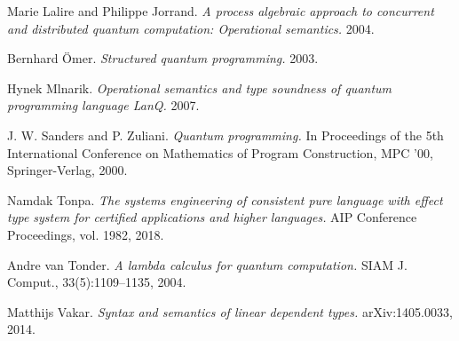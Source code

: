 \documentclass{article}
\theoremstyle{definition}
\begin{document}
\begin{thebibliography}{99}
Marie Lalire and Philippe Jorrand.
\textit{A process algebraic approach to concurrent and distributed quantum computation: Operational semantics.}
2004.

Bernhard Ömer.
\textit{Structured quantum programming.}
2003.

Hynek Mlnarik.
\textit{Operational semantics and type soundness of quantum programming language LanQ.}
2007.

J. W. Sanders and P. Zuliani.
\textit{Quantum programming.}
In Proceedings of the 5th International Conference on Mathematics of Program Construction, MPC '00, Springer-Verlag, 2000.

Namdak Tonpa.
\textit{The systems engineering of consistent pure language with effect type system for certified applications and higher languages.}
AIP Conference Proceedings, vol. 1982, 2018.

Andre van Tonder.
\textit{A lambda calculus for quantum computation.}
SIAM J. Comput., 33(5):1109–1135, 2004.

Matthijs Vakar.
\textit{Syntax and semantics of linear dependent types.}
arXiv:1405.0033, 2014.

\end{thebibliography}
\end{document}
